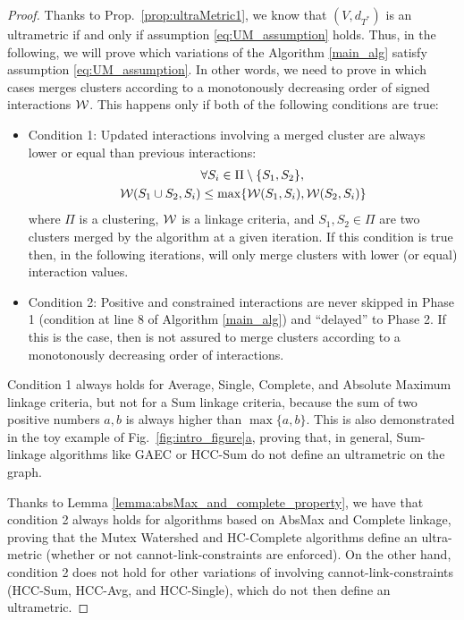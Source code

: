 \secondUltraMetricProperty*
\begin{proof}
Thanks to Prop.~\ref{prop:ultraMetric1}, we know that $(V, d_{T^*})$ is an ultrametric if and only if assumption \ref{eq:UM_assumption} holds. Thus, in the following, we will prove which variations of the \algname{} Algorithm \ref{main_alg} satisfy assumption \ref{eq:UM_assumption}. 
In other words, we need to prove in which cases \algname{} merges clusters according to a monotonously decreasing order of signed interactions $\mathcal{W}{}$. This happens only if both of the following conditions are true:
\begin{itemize}
\item Condition 1: Updated interactions involving a merged cluster are always lower or equal than previous interactions:
\begin{align}\label{eq:condition1}
& \forall S_i \in \Pi \setminus \{S_1, S_2\}, \nonumber \\
\mathcal{W}{}(S_1 \cup S_2, S_i) &\leq \max \{ \mathcal{W}{}(S_1, S_i), \mathcal{W}{}(S_2, S_i)\} 
\end{align}
where $\Pi$ is a clustering, $\mathcal{W}{}$ is a linkage criteria, and $S_1,S_2\in \Pi$ are two clusters merged by the algorithm at a given iteration. If this condition is true then, in the following iterations, \algname{} will only merge clusters with lower (or equal) interaction values. 
\item Condition 2: Positive and constrained interactions are never skipped in Phase 1 (condition at line 8 of Algorithm \ref{main_alg}) and ``delayed'' to Phase 2. If this is the case, then \algname{} is not assured to merge clusters according to a monotonously decreasing order of interactions. 
\end{itemize}
Condition 1 always holds for Average, Single, Complete, and Absolute Maximum linkage criteria, but not for a Sum linkage criteria, because the sum of two positive numbers $a,b$ is always higher than $\max\{a,b\}$. This is also demonstrated in the toy example of Fig.~\hyperref[fig:intro_figure]{\ref*{fig:intro_figure}a}, proving that, in general, Sum-linkage algorithms like GAEC or HCC-Sum do not define an ultrametric on the graph.

Thanks to Lemma \ref{lemma:absMax_and_complete_property}, we have that condition 2 always holds for algorithms based on AbsMax and Complete linkage, proving that the Mutex Watershed and HC-Complete algorithms define an ultra-metric (whether or not cannot-link-constraints are enforced). On the other hand, condition 2 does not hold for other variations of \algname{} involving cannot-link-constraints (HCC-Sum, HCC-Avg, and HCC-Single), which do not then define an ultrametric. 


\end{proof}

